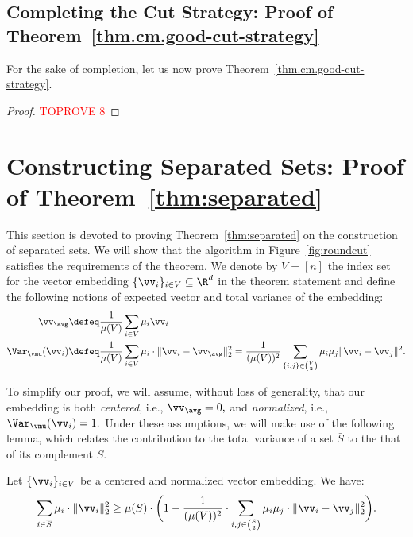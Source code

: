 \documentclass[letterpaper]{article}
\begin{document}
\subsection{Completing the Cut Strategy: Proof of Theorem~\ref{thm.cm.good-cut-strategy}}

For the sake of completion, let us now prove Theorem~\ref{thm.cm.good-cut-strategy}.

\cmGoodCutStrategy*
\begin{proof}\textcolor{red}{TOPROVE 8}\end{proof}
 

\section{Constructing Separated Sets: Proof of Theorem~\ref{thm:separated}}
\label{sec.separated}

This section is devoted to proving Theorem~\ref{thm:separated} on the construction of separated sets. We will show that the algorithm \roundcut in Figure~\ref{fig:roundcut} satisfies the requirements of the theorem.
We denote by $V = [n]$ the index set for the vector embedding $\{ \vv_i \}_{i \in V} \subseteq \R^d$ in the theorem statement and define the following notions of expected vector and total variance of the embedding:
\begin{align*}
\vv_{\avg}
&\defeq \frac{1}{\mu(V)} \sum_{i \in V} \mu_i \vv_i \\
\Var_{\vmu} (\vv_i)
&\defeq \frac{1}{\mu(V)}\sum_{i \in V} \mu_i \cdot \lVert \vv_i - \vv_{\avg} \rVert_2^2
= \frac{1}{(\mu(V))^2} \sum_{\{i,j\} \in \binom{V}{2}} \mu_i \mu_j \|\vv_i - \vv_j\|^2 .
\end{align*}

To simplify our proof, we will assume, without loss of generality, that our embedding is both \emph{centered},
i.e., $\vv_{\avg} = 0,$
and \emph{normalized}, i.e., $\Var_{\vmu} (\vv_i) = 1.$
Under these assumptions, we will make use of the following lemma, which relates the contribution to the total variance of a set $\bar{S}$ to the that of its complement $S$.
\begin{lemma}
\label{lem.variance}
Let $\{ \vv_i \}_{i \in V}$ be a centered and normalized vector embedding. We have:
\begin{equation*}
\sum_{i \in \overline{S}} \mu_i \cdot \lVert \vv_i \rVert_2^2 \geq \mu(S) \cdot  \bigg( 1 - \frac{1}{(\mu(V))^2} \cdot \sum_{i,j \in \binom{S}{2}} \mu_i \mu_j \cdot \lVert \vv_i - \vv_j \rVert_2^2 \bigg).
\end{equation*}
\end{lemma}
\end{document}
